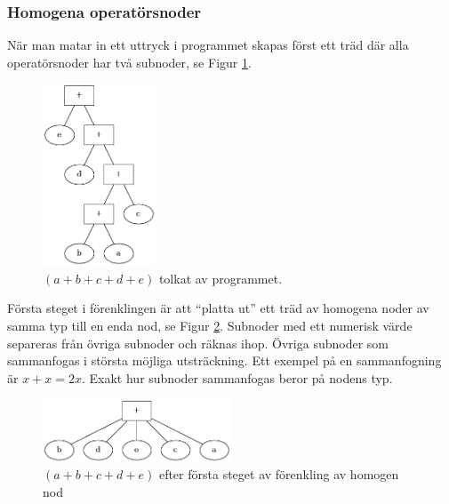 \documentclass[12pt,a4paper]{article}
\begin{document}
\subsubsection{Homogena operatörsnoder}
\label{subsec:homogena}
När man matar in ett uttryck i programmet skapas först ett träd där alla operatörsnoder har två subnoder, se Figur \ref{fig:2311}.
\begin{figure}[H]
  \centering
  \includegraphics[width=0.3\textwidth]{image22}
  \caption{\((a + b + c + d + e)\) tolkat av programmet.}
  \label{fig:2311}
\end{figure}
Första steget i förenklingen är att ``platta ut'' ett träd av homogena noder av samma typ till en enda nod, se Figur \ref{fig:2312}. Subnoder med ett numerisk värde separeras från övriga subnoder och räknas ihop. Övriga subnoder som sammanfogas i största möjliga utsträckning. Ett exempel på en sammanfogning är \(x + x = 2x \). Exakt hur subnoder sammanfogas beror på nodens typ.
\begin{figure}[h!]
  \centering
  \includegraphics[width=0.5\textwidth]{image16}
  \caption{\((a + b + c + d + e)\) efter första steget av förenkling av homogen nod}
  \label{fig:2312}
\end{figure}
\end{document}
